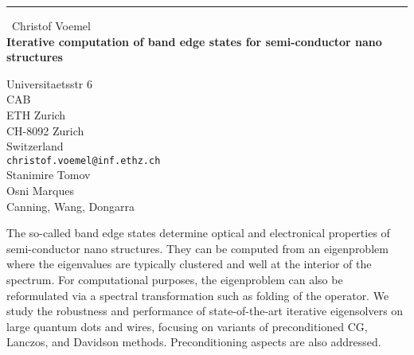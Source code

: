 \documentclass{report}
\begin{document}
\begin{center}
\rule{6in}{1pt} \
{\large Christof Voemel \\
{\bf Iterative computation of band edge states for semi-conductor nano structures}}

Universitaetsstr 6 \\ CAB \\ ETH Zurich \\ CH-8092 Zurich \\ Switzerland
\\
{\tt christof.voemel@inf.ethz.ch}\\
Stanimire Tomov\\
Osni Marques\\
	Canning, Wang, Dongarra\end{center}

The so-called band edge states determine optical and electronical
properties of semi-conductor nano structures. They can be computed from
an eigenproblem where the eigenvalues are typically
clustered and well at the interior of the spectrum.
For computational purposes, the eigenproblem can also be reformulated via
a spectral transformation such as folding of the operator. We study the
robustness and performance of state-of-the-art iterative eigensolvers on
large quantum dots and wires, focusing on variants of preconditioned CG,
Lanczos, and Davidson methods. Preconditioning aspects are also
addressed.
\end{document}
